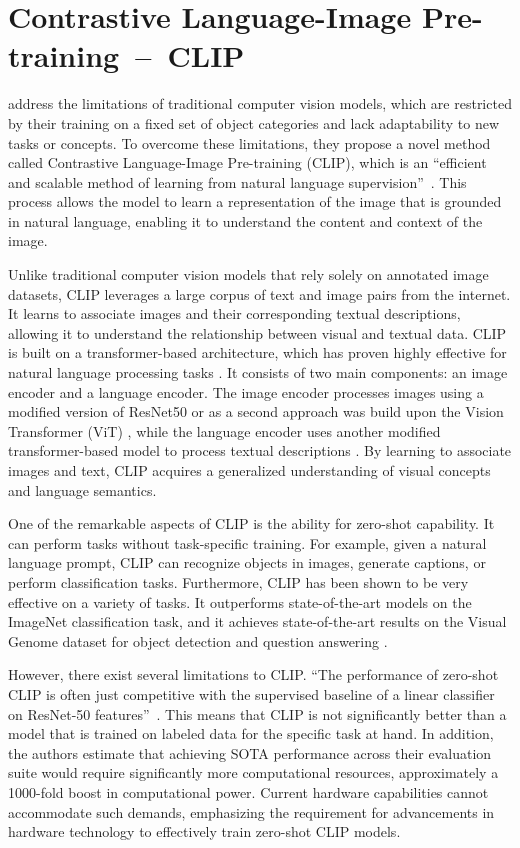 \section{Contrastive Language-Image Pre-training~--~CLIP}\label{CLIP}

\citeauthor{radfordCLIP} address the limitations of traditional computer vision models, which are restricted by their training on a fixed set of object categories and lack adaptability to new tasks or concepts. To overcome these limitations, they propose a novel method called Contrastive Language-Image Pre-training (CLIP), which is an ``efficient and scalable method of learning from natural language supervision''~\citep{radfordCLIP}. This process allows the model to learn a representation of the image that is grounded in natural language, enabling it to understand the content and context of the image.

Unlike traditional computer vision models that rely solely on annotated image datasets, CLIP leverages a large corpus of text and image pairs from the internet. It learns to associate images and their corresponding textual descriptions, allowing it to understand the relationship between visual and textual data. CLIP is built on a transformer-based architecture, which has proven highly effective for natural language processing tasks \citep{radfordCLIP}. It consists of two main components: an image encoder and a language encoder. The image encoder processes images using a modified version of ResNet50 \citep{heResnet} or as a second approach was build upon the Vision Transformer (ViT) \citep{dosovitskiyViT}, while the language encoder uses another modified transformer-based model to process textual descriptions \citep{vaswani2023attention}. By learning to associate images and text, CLIP acquires a generalized understanding of visual concepts and language semantics.

One of the remarkable aspects of CLIP is the ability for zero-shot capability. It can perform tasks without task-specific training. For example, given a natural language prompt, CLIP can recognize objects in images, generate captions, or perform classification tasks. Furthermore, CLIP has been shown to be very effective on a variety of tasks. It outperforms state-of-the-art models on the ImageNet classification task, and it achieves state-of-the-art results on the Visual Genome dataset for object detection and question answering \citep{radfordCLIP}.

However, there exist several limitations to CLIP\@. ``The performance of zero-shot CLIP is often just competitive with the supervised baseline of a linear classifier on ResNet-50 features''~\citep{radfordCLIP}.  This means that CLIP is not significantly better than a model that is trained on labeled data for the specific task at hand. In addition, the authors estimate that achieving SOTA performance across their evaluation suite would require significantly more computational resources, approximately a 1000-fold boost in computational power. Current hardware capabilities cannot accommodate such demands, emphasizing the requirement for advancements in hardware technology to effectively train zero-shot CLIP models.